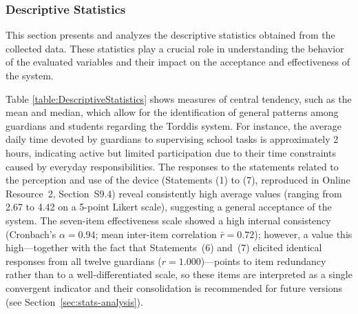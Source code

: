 \subsubsection{Descriptive Statistics}
This section presents and analyzes the descriptive statistics obtained from the collected data. These statistics play a crucial role in understanding the behavior of the evaluated variables and their impact on the acceptance and effectiveness of the system.

Table \ref{table:DescriptiveStatistics} shows measures of central tendency, such as the mean and median, which allow for the identification of general patterns among guardians and students regarding the Torddis system. For instance, the average daily time devoted by guardians to supervising school tasks is approximately 2 hours, indicating active but limited participation due to their time constraints caused by everyday responsibilities. The responses to the statements related to the perception and use of the device (Statements (1) to (7), reproduced in Online Resource~2, Section~S9.4) reveal consistently high average values (ranging from 2.67 to 4.42 on a 5-point Likert scale), suggesting a general acceptance of the system. The seven-item effectiveness scale showed a high internal consistency (Cronbach's $\alpha = 0.94$; mean inter-item correlation $\bar{r} = 0.72$); however, a value this high---together with the fact that Statements~(6) and~(7) elicited identical responses from all twelve guardians ($r = 1.000$)---points to item redundancy rather than to a well-differentiated scale, so these items are interpreted as a single convergent indicator and their consolidation is recommended for future versions (see Section~\ref{sec:stats-analysis}).

